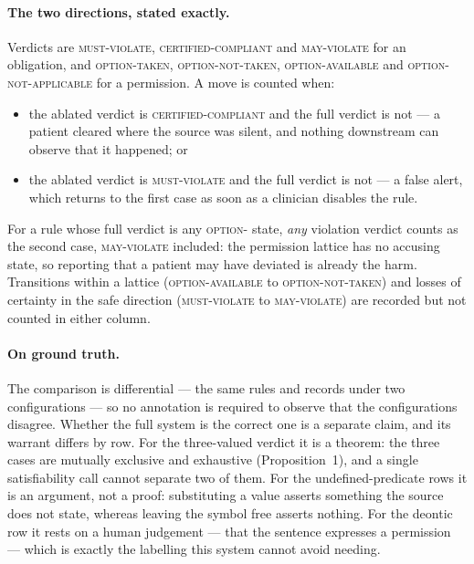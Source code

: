 \paragraph{The two directions, stated exactly.}
Verdicts are \textsc{must-violate}, \textsc{certified-compliant} and
\textsc{may-violate} for an obligation, and \textsc{option-taken},
\textsc{option-not-taken}, \textsc{option-available} and
\textsc{option-not-applicable} for a permission. A move is counted when:
\begin{itemize}\itemsep1pt
  \item the ablated verdict is \textsc{certified-compliant} and the full
        verdict is not --- a patient cleared where the source was silent, and
        nothing downstream can observe that it happened; or
  \item the ablated verdict is \textsc{must-violate} and the full verdict is
        not --- a false alert, which returns to the first case as soon as a
        clinician disables the rule.
\end{itemize}
For a rule whose full verdict is any \textsc{option-} state, \emph{any}
violation verdict counts as the second case, \textsc{may-violate} included: the
permission lattice has no accusing state, so reporting that a patient may have
deviated is already the harm. Transitions within a lattice
(\textsc{option-available} to \textsc{option-not-taken}) and losses of
certainty in the safe direction (\textsc{must-violate} to
\textsc{may-violate}) are recorded but not counted in either column.

\paragraph{On ground truth.}
The comparison is differential --- the same rules and records under two
configurations --- so no annotation is required to observe that the
configurations disagree. Whether the full system is the correct one is a
separate claim, and its warrant differs by row. For the three-valued verdict it
is a theorem: the three cases are mutually exclusive and exhaustive
(Proposition~1), and a single satisfiability call cannot separate two of them.
For the undefined-predicate rows it is an argument, not a proof: substituting a
value asserts something the source does not state, whereas leaving the symbol
free asserts nothing. For the deontic row it rests on a human judgement --- that
the sentence expresses a permission --- which is exactly the labelling this
system cannot avoid needing.

